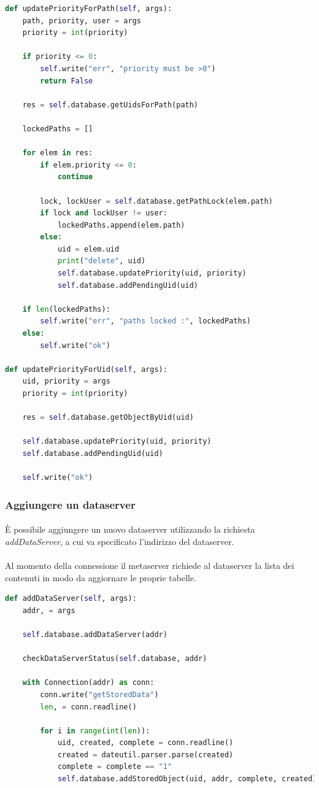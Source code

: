\documentclass[11pt,a4paper,english]{article}
\begin{document}
\begin{lstlisting}[language=Python, title=Metaserver]
def updatePriorityForPath(self, args):
    path, priority, user = args
    priority = int(priority)

    if priority <= 0:
        self.write("err", "priority must be >0")
        return False

    res = self.database.getUidsForPath(path)

    lockedPaths = []

    for elem in res:
        if elem.priority <= 0:
            continue

        lock, lockUser = self.database.getPathLock(elem.path)
        if lock and lockUser != user:
            lockedPaths.append(elem.path)
        else:
            uid = elem.uid
            print("delete", uid)
            self.database.updatePriority(uid, priority)
            self.database.addPendingUid(uid)

    if len(lockedPaths):
        self.write("err", "paths locked :", lockedPaths)
    else:
        self.write("ok")

def updatePriorityForUid(self, args):
    uid, priority = args
    priority = int(priority)

    res = self.database.getObjectByUid(uid)

    self.database.updatePriority(uid, priority)
    self.database.addPendingUid(uid)

    self.write("ok")
\end{lstlisting}

\subsubsection{Aggiungere un dataserver}

\paragraph{} È possibile aggiungere un nuovo dataserver utilizzando la richiesta \emph{addDataServer}, a cui va specificato l'indirizzo del dataserver. 

\paragraph{} Al momento della connessione il metaserver richiede al dataserver la lista dei contenuti in modo da aggiornare le proprie tabelle. 

\begin{lstlisting}[language=Python, title=Metaserver]
def addDataServer(self, args):
    addr, = args

    self.database.addDataServer(addr)

    checkDataServerStatus(self.database, addr)

    with Connection(addr) as conn:
        conn.write("getStoredData")
        len, = conn.readline()

        for i in range(int(len)):
            uid, created, complete = conn.readline()
            created = dateutil.parser.parse(created)
            complete = complete == "1"
            self.database.addStoredObject(uid, addr, complete, created)
\end{lstlisting}
\end{document}
